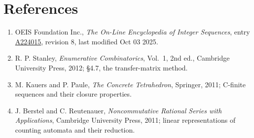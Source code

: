 \documentclass[11pt]{article}
\theoremstyle{definition}
\begin{document}
\section{References}

\begin{enumerate}

\item OEIS Foundation Inc., \emph{The On-Line Encyclopedia of Integer Sequences}, entry \href{https://oeis.org/A224015}{A224015}, revision 8, last modified Oct 03 2025.

\item R. P. Stanley, \emph{Enumerative Combinatorics}, Vol.~1, 2nd ed., Cambridge University Press, 2012; \S4.7, the transfer-matrix method.

\item M. Kauers and P. Paule, \emph{The Concrete Tetrahedron}, Springer, 2011; C-finite sequences and their closure properties.

\item J. Berstel and C. Reutenauer, \emph{Noncommutative Rational Series with Applications}, Cambridge University Press, 2011; linear representations of counting automata and their reduction.

\end{enumerate}
\end{document}
